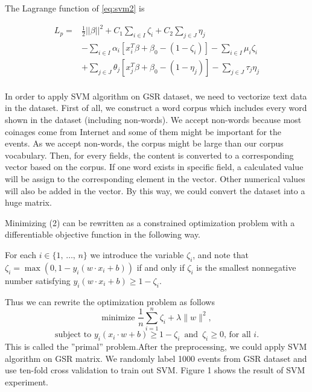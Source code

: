 The Lagrange function of \ref{eq:svm2} is

\begin{equation}
\label{eq:svm2}
\begin{aligned}
    L_p =&  \frac 1 2||\beta||^2 + C_1 \sum_{i\in I} \zeta_i + C_2 \sum_{j\in J} \eta_j\\
        &-\sum_{i \in I}\alpha_i[x_i^T\beta+\beta_0- (1-\zeta_i)]-\sum_{i \in I}\mu_i\zeta_i\\
        &+\sum_{j \in J}\theta_j[x_j^T\beta+\beta_0- (1-\eta_j)]-\sum_{j \in J}\tau_j\eta_j\\
\end{aligned}
\end{equation}


In order to apply SVM algorithm on GSR dataset, we need to vectorize text data in the dataset. First of all, we construct a word corpus which includes every word shown in the dataset (including non-words). We accept non-words because most coinages come from Internet and some of them might be important for the events. As we accept non-words, the corpus might be large than our corpus vocabulary. Then, for every fields, the content is converted to a corresponding vector based on the corpus. If one word exists in specific field, a calculated value will be assign to the corresponding element in the vector. Other numerical values will also be added in the vector. By this way, we could convert the dataset into a huge matrix.

Minimizing (2) can be rewritten as a constrained optimization problem with a differentiable objective function in the following way.

For each $i \in \{1,\,\ldots,\,n\}$ we introduce the variable $\zeta_i$, and note that $ \zeta_i = \max\left(0, 1 - y_i(w\cdot x_i + b)\right)$  if and only if $ \zeta_i$ is the smallest nonnegative number satisfying $ y_i(w\cdot x_i + b) \geq 1- \zeta_i.$

Thus we can rewrite the optimization problem as follows$$ \text{minimize } \frac 1 n \sum_{i=1}^n \zeta_i + \lambda\|w\|^2 ,$$ $$ \text{subject to } y_i(x_i \cdot w + b) \geq 1 - \zeta_i \,\text{ and }\,\zeta_i \geq 0,\,\text{for all }i.$$This is called the ''primal'' problem.After the preprocessing, we could apply SVM algorithm on GSR matrix. We randomly label 1000 events from GSR dataset and use ten-fold cross validation to train out SVM. Figure 1 shows the result of SVM experiment.


